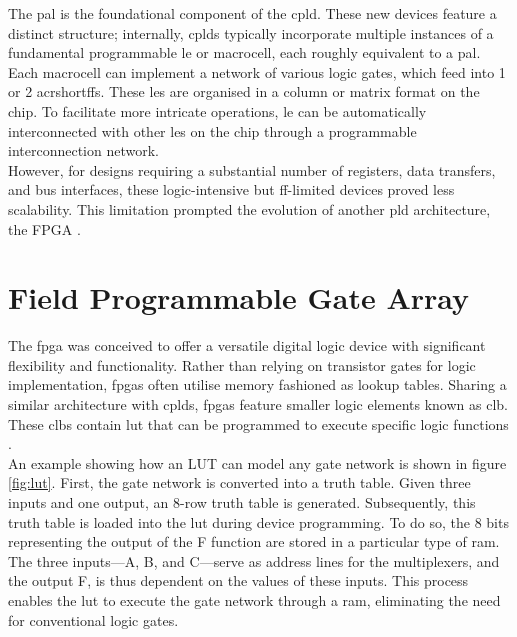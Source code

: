 The \acrshort{pal} is the foundational component of the \acrshort{cpld}. 
These new devices feature a distinct structure; 
internally, \acrshort{cpld}s typically incorporate multiple 
instances of a fundamental programmable \acrfull{le} or macrocell, each roughly 
equivalent to a \acrshort{pal}. Each macrocell can 
implement a network of various logic gates, 
which feed into 1 or 2 acrshort{ff}s. These \acrshort{le}s are organised 
in a column or matrix format on the chip.
To facilitate more intricate 
operations, \acrshort{le} can be automatically interconnected 
with other \acrshort{le}s on the chip through a programmable 
interconnection network.\\
However, for designs 
requiring a substantial number of registers, 
data transfers, and bus interfaces, these 
logic-intensive but \acrshort{ff}-limited devices 
proved less scalability. 
This limitation prompted 
the evolution of another \acrshort{pld} architecture, the 
FPGA \cite{RapidPrototyping}.\\

\section{Field Programmable Gate Array}
The \acrshort{fpga} was conceived to offer a versatile 
digital logic device with significant flexibility 
and functionality. Rather than relying on 
transistor gates for logic implementation, 
\acrshort{fpga}s often utilise memory fashioned as lookup 
tables. Sharing a similar architecture with 
\acrshort{cpld}s, \acrshort{fpga}s feature smaller logic elements 
known as \acrfull{clb}. These \acrshort{clb}s contain \acrfull{lut} that can 
be programmed to execute specific logic 
functions \cite{WILSON}.\\

An example showing how an LUT can model any gate 
network is shown in figure \ref{fig:lut}. 
First, the gate network is converted into a truth table. Given three inputs and one output, an 8-row truth table is generated. Subsequently, this truth table is loaded into the \acrshort{lut} during device programming. To do so, the 8 bits representing the output of the F function are stored in a particular type of \acrshort{ram}.\\
The three inputs—A, B, and C—serve as address lines for the multiplexers, and the output F, is thus dependent on the values of these inputs. This process enables the \acrshort{lut} to execute the gate network through a \acrshort{ram}, eliminating the need for conventional logic gates.\\

